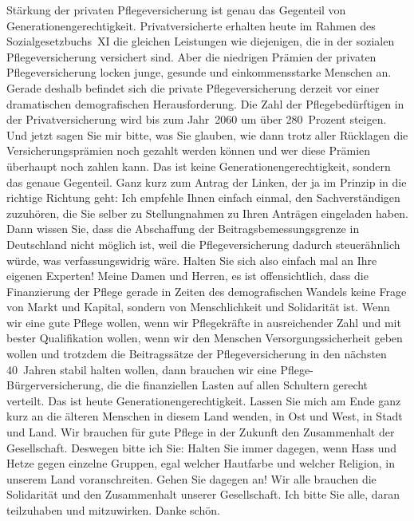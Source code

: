 \documentclass{article}
\begin{document}
Stärkung der privaten Pflegeversicherung ist genau das Gegenteil von Generationengerechtigkeit. Privatversicherte erhalten heute im Rahmen des Sozialgesetzbuchs XI die gleichen Leistungen wie diejenigen, die in der sozialen Pflegeversicherung versichert sind. Aber die niedrigen Prämien der privaten Pflegeversicherung locken junge, gesunde und einkommensstarke Menschen an. Gerade deshalb befindet sich die private Pflegeversicherung derzeit vor einer dramatischen demografischen Herausforderung. Die Zahl der Pflegebedürftigen in der Privatversicherung wird bis zum Jahr 2060 um über 280 Prozent steigen. Und jetzt sagen Sie mir bitte, was Sie glauben, wie dann trotz aller Rücklagen die Versicherungsprämien noch gezahlt werden können und wer diese Prämien überhaupt noch zahlen kann. Das ist keine Generationengerechtigkeit, sondern das genaue Gegenteil.  Ganz kurz zum Antrag der Linken, der ja im Prinzip in die richtige Richtung geht: Ich empfehle Ihnen einfach einmal, den Sachverständigen zuzuhören, die Sie selber zu Stellungnahmen zu Ihren Anträgen eingeladen haben. Dann wissen Sie, dass die Abschaffung der Beitragsbemessungsgrenze in Deutschland nicht möglich ist, weil die Pflegeversicherung dadurch steuerähnlich würde, was verfassungswidrig wäre. Halten Sie sich also einfach mal an Ihre eigenen Experten!  Meine Damen und Herren, es ist offensichtlich, dass die Finanzierung der Pflege gerade in Zeiten des demografischen Wandels keine Frage von Markt und Kapital, sondern von Menschlichkeit und Solidarität ist.  Wenn wir eine gute Pflege wollen, wenn wir Pflegekräfte in ausreichender Zahl und mit bester Qualifikation wollen, wenn wir den Menschen Versorgungssicherheit geben wollen und trotzdem die Beitragssätze der Pflegeversicherung in den nächsten 40 Jahren stabil halten wollen, dann brauchen wir eine Pflege-Bürgerversicherung, die die finanziellen Lasten auf allen Schultern gerecht verteilt. Das ist heute Generationengerechtigkeit.  Lassen Sie mich am Ende ganz kurz an die älteren Menschen in diesem Land wenden, in Ost und West, in Stadt und Land. Wir brauchen für gute Pflege in der Zukunft den Zusammenhalt der Gesellschaft. Deswegen bitte ich Sie: Halten Sie immer dagegen, wenn Hass und Hetze gegen einzelne Gruppen, egal welcher Hautfarbe und welcher Religion, in unserem Land voranschreiten. Gehen Sie dagegen an! Wir alle brauchen die Solidarität und den Zusammenhalt unserer Gesellschaft. Ich bitte Sie alle, daran teilzuhaben und mitzuwirken. Danke schön.  
\end{document}

